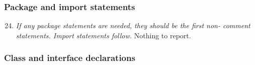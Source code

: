 	\subsubsection{Package and import statements}
		\begin{enumerate}
			\setcounter{enumi}{23}
			\item \textit{If any package statements are needed, they should be the first non- comment statements. Import statements follow.}\newline
			Nothing to report. %

		\end{enumerate}

	\subsubsection{Class and interface declarations}
